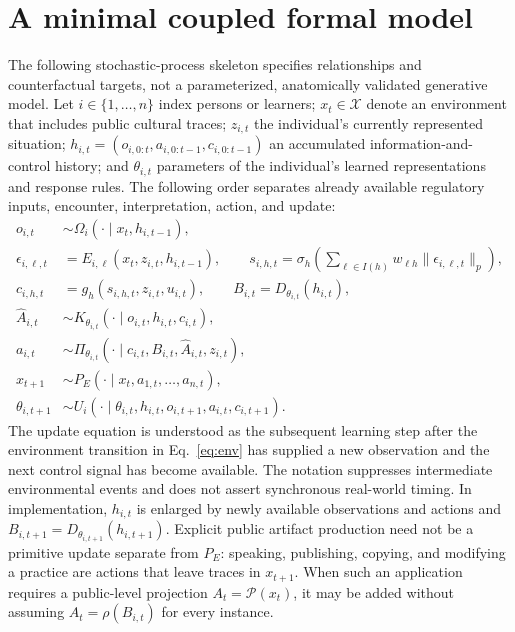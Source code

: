 \documentclass[11pt,a4paper]{article}
\begin{document}
\section{A minimal coupled formal model}
The following stochastic-process skeleton specifies relationships and counterfactual targets, not a parameterized, anatomically validated generative model. Let $i\in\{1,\ldots,n\}$ index persons or learners; $x_t\in\mathcal X$ denote an environment that includes public cultural traces; $z_{i,t}$ the individual's currently represented situation; $h_{i,t}=(o_{i,0:t},a_{i,0:t-1},c_{i,0:t-1})$ an accumulated information-and-control history; and $\theta_{i,t}$ parameters of the individual's learned representations and response rules. The following order separates already available regulatory inputs, encounter, interpretation, action, and update:
\begin{align}
 o_{i,t}&\sim\Omega_i(\cdot\mid x_t,h_{i,t-1}), \label{eq:observation}\\
 \epsilon_{i,\ell,t}&=E_{i,\ell}(x_t,z_{i,t},h_{i,t-1}),\qquad
 s_{i,h,t}=\sigma_h\!\left(\sum_{\ell\in I(h)} w_{\ell h}\lVert\epsilon_{i,\ell,t}\rVert_p\right), \label{eq:loops}\\
 c_{i,h,t}&=g_h(s_{i,h,t},z_{i,t},u_{i,t}),\qquad
 B_{i,t}=D_{\theta_{i,t}}(h_{i,t}),\label{eq:controlbundle}\\
 \widehat A_{i,t}&\sim K_{\theta_{i,t}}(\cdot\mid o_{i,t},h_{i,t},c_{i,t}),\label{eq:innerrec}\\
 a_{i,t}&\sim\Pi_{\theta_{i,t}}(\cdot\mid c_{i,t},B_{i,t},\widehat A_{i,t},z_{i,t}),\label{eq:innerpolicy}\\
 x_{t+1}&\sim P_E(\cdot\mid x_t,a_{1,t},\ldots,a_{n,t}),\label{eq:env}\\
 \theta_{i,t+1}&\sim U_i(\cdot\mid\theta_{i,t},h_{i,t},o_{i,t+1},a_{i,t},c_{i,t+1}).\label{eq:update}
\end{align}
The update equation is understood as the subsequent learning step after the environment transition in Eq.~\eqref{eq:env} has supplied a new observation and the next control signal has become available. The notation suppresses intermediate environmental events and does not assert synchronous real-world timing. In implementation, $h_{i,t}$ is enlarged by newly available observations and actions and $B_{i,t+1}=D_{\theta_{i,t+1}}(h_{i,t+1})$. Explicit public artifact production need not be a primitive update separate from $P_E$: speaking, publishing, copying, and modifying a practice are actions that leave traces in $x_{t+1}$. When such an application requires a public-level projection $A_t=\mathcal P(x_t)$, it may be added without assuming $A_t=\rho(B_{i,t})$ for every instance.
\end{document}
